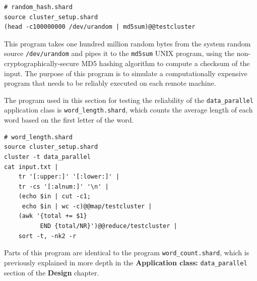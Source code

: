 \documentclass[oneside]{report}
\begin{document}
\begin{minipage}[c]{\textwidth-15pt}
  \begin{lstlisting}[language=Shard]
# random_hash.shard
source cluster_setup.shard
(head -c100000000 /dev/urandom | md5sum)@@testcluster
\end{lstlisting}
  \smallskip
\end{minipage}

\begin{sloppypar}
  This program takes one hundred million random bytes from the system random source \texttt{/dev/urandom} and pipes it to the \texttt{md5sum} UNIX program, using the non-cryptographically-secure MD5 hashing algorithm to compute a checksum of the input.
  The purpose of this program is to simulate a computationally expensive program that needs to be reliably executed on each remote machine.
\end{sloppypar}

\begin{sloppypar}
  The program used in this section for testing the reliability of the \texttt{data\_parallel} application class is \texttt{word\_length.shard}, which counts the average length of each word based on the first letter of the word.
\end{sloppypar}

\begin{minipage}[c]{\textwidth-15pt}
  \begin{lstlisting}[language=Shard]
# word_length.shard
source cluster_setup.shard
cluster -t data_parallel
cat input.txt |
    tr '[:upper:]' '[:lower:]' |
    tr -cs '[:alnum:]' '\n' |
    (echo $in | cut -c1;
     echo $in | wc -c)@@map/testcluster |
    (awk '{total += $1}
          END {total/NR}')@@reduce/testcluster |
    sort -t, -nk2 -r
\end{lstlisting}
  \smallskip
\end{minipage}

Parts of this program are identical to the program \texttt{word\_count.shard}, which is previously explained in more depth in the \textbf{Application class: }\texttt{data\_parallel} section of the \textbf{Design} chapter.
\end{document}
